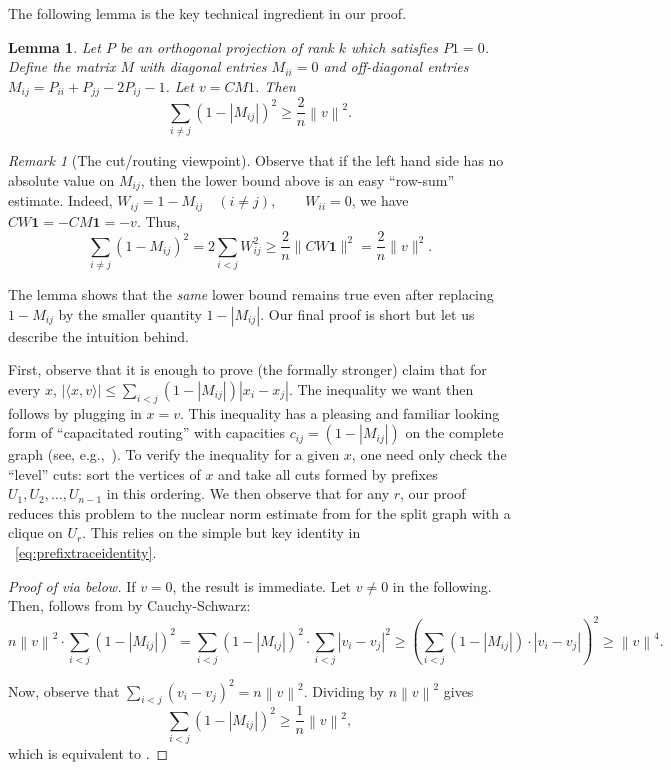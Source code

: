 \documentclass[10pt,reqno]{amsart}
\newtheorem{lemma}[theorem]{Lemma}
\theoremstyle{definition}
\theoremstyle{remark}
\newtheorem{remark}[theorem]{Remark}
\numberwithin{equation}{section}
\newcommand{\norm}[1]{\left\| #1 \right\|}
\begin{document}
The following lemma is the key technical ingredient in our proof. 


\begin{lemma}\label{lem:minequalityprop}
Let $P$ be an orthogonal projection of rank $k$ which satisfies $P1=0$. Define the matrix $M$ with diagonal entries $M_{ii}=0$ and off-diagonal entries $M_{ij}=P_{ii}+P_{jj}-2P_{ij}-1$. Let $v=CM1$. Then
\begin{equation}\label{eq:Minequality}
    \sum\limits_{i\ne j}(1-|M_{ij}|)^2\ge \dfrac{2}{n}\norm{v}^2.
\end{equation}
\end{lemma}


\begin{remark}[The cut/routing viewpoint]

Observe that if the left hand side has no absolute value on $M_{ij}$, then the lower bound above is an easy ``row-sum'' estimate. Indeed,  $W_{ij}=1-M_{ij}\quad (i\neq j),\qquad W_{ii}=0$, 
we have
$CW\mathbf 1=-CM\mathbf 1=-v$. 
Thus,
\[
\sum_{i\ne j}(1-M_{ij})^2
=
2\sum_{i<j}W_{ij}^2
\ge
\frac{2}{n}\|CW\mathbf 1\|^2
=
\frac{2}{n}\|v\|^2.
\]


The lemma shows that the \emph{same} lower bound remains true even after
replacing $1-M_{ij}$ by the smaller quantity $1-|M_{ij}|$. Our final proof is short but let us describe the intuition behind. 

First, observe that it is enough to prove (the formally stronger) claim that for every $x$, $|\langle x,v\rangle| \le \sum_{i<j}(1-|M_{ij}|) |x_i-x_j|$. The inequality we want then follows by plugging in $x= v$. This inequality has a pleasing and familiar looking form of ``capacitated routing'' with capacities $c_{ij} = (1-|M_{ij}|)$ on the complete graph (see, e.g.,~\cite[Theorem~5.19]{ChekuriNotes}). To verify the inequality for a given $x$, one need only check the ``level'' cuts: sort the vertices of $x$ and take all cuts formed by prefixes $U_1, U_2,\ldots,U_{n-1}$ in this ordering. We then observe that for any $r$, our proof reduces this problem to the nuclear norm estimate from  for the split graph with a clique on $U_r$. This relies on the simple but key identity in ~\eqref{eq:prefixtraceidentity}. 
\end{remark}




\begin{proof}[Proof of  via  below]
If $v=0$, the result is immediate. Let $v \neq 0$ in the following. 
Then,  follows from  by Cauchy-Schwarz:
$$n\norm{v}^2\cdot  \sum\limits_{i< j}(1-|M_{ij}|)^2= \sum\limits_{i< j}(1-|M_{ij}|)^2\cdot\sum\limits_{i< j}|v_i-v_j|^2\ge \left ( \sum\limits_{i<j}(1-|M_{ij}|)\cdot |v_i-v_j|\right )^2\ge \norm{v}^4.$$

Now, observe that $\sum_{i<j} (v_i-v_j)^2 = n \norm{v}^2$. Dividing by $n\norm{v}^2$ gives
\[
        \sum_{i<j}(1-|M_{ij}|)^2\geq \frac{1}{n}\norm{v}^2,
\]
which is equivalent to .
\end{proof}
\end{document}
